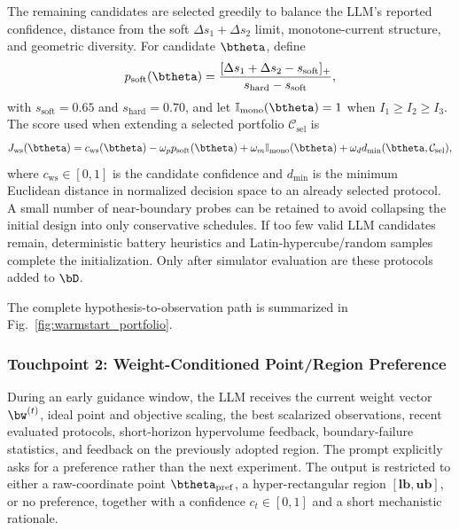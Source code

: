 The remaining candidates are selected greedily to balance the LLM's reported
confidence, distance from the soft $\Delta s_1+\Delta s_2$ limit, monotone-current
structure, and geometric diversity. For candidate $\btheta$, define
\begin{equation}
p_{\mathrm{soft}}(\btheta)=
\frac{[\Delta s_1+\Delta s_2-s_{\mathrm{soft}}]_+}
{s_{\mathrm{hard}}-s_{\mathrm{soft}}},
\label{eq:softpen}
\end{equation}
with $s_{\mathrm{soft}}=0.65$ and $s_{\mathrm{hard}}=0.70$, and let
$\mathbb{I}_{\mathrm{mono}}(\btheta)=1$ when $I_1\ge I_2\ge I_3$. The score used
when extending a selected portfolio $\mathcal C_{\mathrm{sel}}$ is
\begin{equation}
J_{\mathrm{ws}}(\btheta)=
c_{\mathrm{ws}}(\btheta)
-\omega_p p_{\mathrm{soft}}(\btheta)
+\omega_m\mathbb{I}_{\mathrm{mono}}(\btheta)
+\omega_d d_{\min}(\btheta,\mathcal C_{\mathrm{sel}}),
\label{eq:portfolio}
\end{equation}
where $c_{\mathrm{ws}}\in[0,1]$ is the candidate confidence and $d_{\min}$ is
the minimum Euclidean distance in normalized decision space to an already
selected protocol. A small number of near-boundary probes can be retained to
avoid collapsing the initial design into only conservative schedules. If too
few valid LLM candidates remain, deterministic battery heuristics and
Latin-hypercube/random samples complete the initialization. Only after simulator
evaluation are these protocols added to $\bD$.

The complete hypothesis-to-observation path is summarized in
Fig.~\ref{fig:warmstart_portfolio}.


\subsubsection{Touchpoint 2: Weight-Conditioned Point/Region Preference}

During an early guidance window, the LLM receives the current weight vector
$\bw^{(t)}$, ideal point and objective scaling, the best scalarized observations,
recent evaluated protocols, short-horizon hypervolume feedback, boundary-failure
statistics, and feedback on the previously adopted region. The prompt explicitly
asks for a preference rather than the next experiment. The output is restricted
to either a raw-coordinate point $\btheta_{\mathrm{pref}}$, a hyper-rectangular
region $[\mathbf{lb},\mathbf{ub}]$, or no preference, together with a confidence
$c_t\in[0,1]$ and a short mechanistic rationale.

